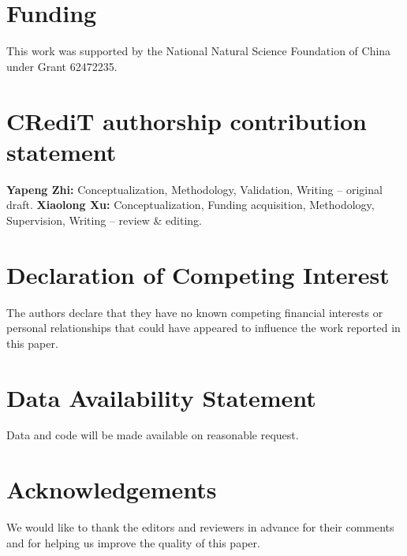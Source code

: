 \documentclass[final,5p,times]{elsarticle}
\begin{document}
\section*{Funding}

This work was supported by the National Natural Science Foundation of China under Grant 62472235.

\section*{CRediT authorship contribution statement}

\textbf{Yapeng Zhi:} Conceptualization, Methodology, Validation, Writing – original draft. \textbf{Xiaolong Xu:} Conceptualization, Funding acquisition, Methodology, Supervision, Writing – review \& editing.

\section*{Declaration of Competing Interest}

The authors declare that they have no known competing financial interests or personal relationships that could have appeared to influence the work reported in this paper.

\section*{Data Availability Statement}

Data and code will be made available on reasonable request.

\section*{Acknowledgements}

We would like to thank the editors and reviewers in advance for their comments and for helping us improve the quality of this paper.

  
 



%  




\end{document}
